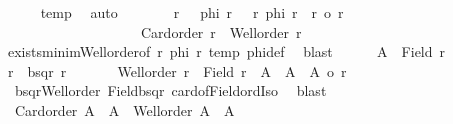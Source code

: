 \begin{isabellebody}
\ \ \ \ \isamarkupfalse%
\ temp{}\ \isamarkupfalse%
\ auto\isanewline
\ \ \ \ \isamarkupfalse%
\ \isamarkupfalse%
\ r\ \ {}{\isacharcolon}{\kern0pt}\ {\isachardoublequoteopen}phi\ r{\isachardoublequoteclose}\ \ {}{\isacharcolon}{\kern0pt}\ {\isachardoublequoteopen}{\isasymforall}r{\isacharprime}{\kern0pt}{\isachardot}{\kern0pt}\ phi\ r{\isacharprime}{\kern0pt}\ {\isasymlongrightarrow}\ r\ {\isasymle}o\ r{\isacharprime}{\kern0pt}{\isachardoublequoteclose}\ \isanewline
\ \ \ \ \ \ \ \ \ \ \ \ \ \ \ \ \ \ \ {}{\isacharcolon}{\kern0pt}\ {\isachardoublequoteopen}Card{\isacharunderscore}{\kern0pt}order\ r\ {\isasymand}\ Well{\isacharunderscore}{\kern0pt}order\ r{\isachardoublequoteclose}\isanewline
\ \ \ \ \isamarkupfalse%
\ exists{\isacharunderscore}{\kern0pt}minim{\isacharunderscore}{\kern0pt}Well{\isacharunderscore}{\kern0pt}order{\isacharbrackleft}{\kern0pt}of\ {\isachardoublequoteopen}{\isacharbraceleft}{\kern0pt}r{\isachardot}{\kern0pt}\ phi\ r{\isacharbraceright}{\kern0pt}{\isachardoublequoteclose}{\isacharbrackright}{\kern0pt}\ temp{}\ phi{\isacharunderscore}{\kern0pt}def\ \isamarkupfalse%
\ blast\isanewline
\ \ \ \ \isamarkupfalse%
\ {\isacharquery}{\kern0pt}A\ {\isacharequal}{\kern0pt}\ {\isachardoublequoteopen}Field\ r{\isachardoublequoteclose}\ \ \isamarkupfalse%
\ {\isacharquery}{\kern0pt}r{\isacharprime}{\kern0pt}\ {\isacharequal}{\kern0pt}\ {\isachardoublequoteopen}bsqr\ r{\isachardoublequoteclose}\isanewline
\ \ \ \ \isamarkupfalse%
\ {}{\isacharcolon}{\kern0pt}\ {\isachardoublequoteopen}Well{\isacharunderscore}{\kern0pt}order\ {\isacharquery}{\kern0pt}r{\isacharprime}{\kern0pt}\ {\isasymand}\ Field\ {\isacharquery}{\kern0pt}r{\isacharprime}{\kern0pt}\ {\isacharequal}{\kern0pt}\ {\isacharquery}{\kern0pt}A\ {\isasymtimes}\ {\isacharquery}{\kern0pt}A\ {\isasymand}\ {\isacharbar}{\kern0pt}{\isacharquery}{\kern0pt}A{\isacharbar}{\kern0pt}\ {\isacharequal}{\kern0pt}o\ r{\isachardoublequoteclose}\isanewline
\ \ \ \ \isamarkupfalse%
\ {}\ bsqr{\isacharunderscore}{\kern0pt}Well{\isacharunderscore}{\kern0pt}order\ Field{\isacharunderscore}{\kern0pt}bsqr\ card{\isacharunderscore}{\kern0pt}of{\isacharunderscore}{\kern0pt}Field{\isacharunderscore}{\kern0pt}ordIso\ \isamarkupfalse%
\ blast\isanewline
\ \ \ \ \isamarkupfalse%
\ {}{\isacharcolon}{\kern0pt}\ {\isachardoublequoteopen}Card{\isacharunderscore}{\kern0pt}order\ {\isacharbar}{\kern0pt}{\isacharquery}{\kern0pt}A\ {\isasymtimes}\ {\isacharquery}{\kern0pt}A{\isacharbar}{\kern0pt}\ {\isasymand}\ Well{\isacharunderscore}{\kern0pt}order\ {\isacharbar}{\kern0pt}{\isacharquery}{\kern0pt}A\ {\isasymtimes}\ {\isacharquery}{\kern0pt}A{\isacharbar}{\kern0pt}{\isachardoublequoteclose}\isanewline

\end{isabellebody}
